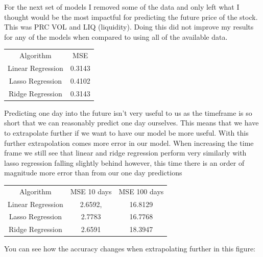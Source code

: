 \documentclass{report}
\begin{document}
For the next set of models I removed some of the data and only left what I thought would be the most impactful for predicting the future price of the stock.
This was PRC VOL and LIQ (liquidity).
Doing this did not improve my results for any of the models when compared to using all of the available data.

\begin{minipage} {\linewidth}
\bigskip
\centering
{}
\begin{tabular}{c c}
    Algorithm & MSE \\
    Linear Regression & 0.3143 \\
    Lasso Regression & 0.4102 \\
    Ridge Regression & 0.3143
\end{tabular}
\bigskip
\end{minipage}

Predicting one day into the future isn't very useful to us as the timeframe is so short that we can reasonably predict one day ourselves. This means that we have to extrapolate further if we want to have our model be more useful.
With this further extrapolation comes more error in our model.
When increasing the time frame we still see that linear and ridge regression perform very similarly with lasso regression falling slightly behind however, this time there is an order of magnitude more error than from our one day predictions

\begin{minipage} {\linewidth}
\bigskip
\centering
{}
\begin{tabular}{c c c}
    Algorithm & MSE 10 days & MSE 100 days \\
    Linear Regression & 2.6592, & 16.8129 \\
    Lasso Regression & 2.7783 & 16.7768 \\
    Ridge Regression & 2.6591 & 18.3947
\end{tabular}
\bigskip
\end{minipage}

You can see how the accuracy changes when extrapolating further in this figure:
\end{document}
